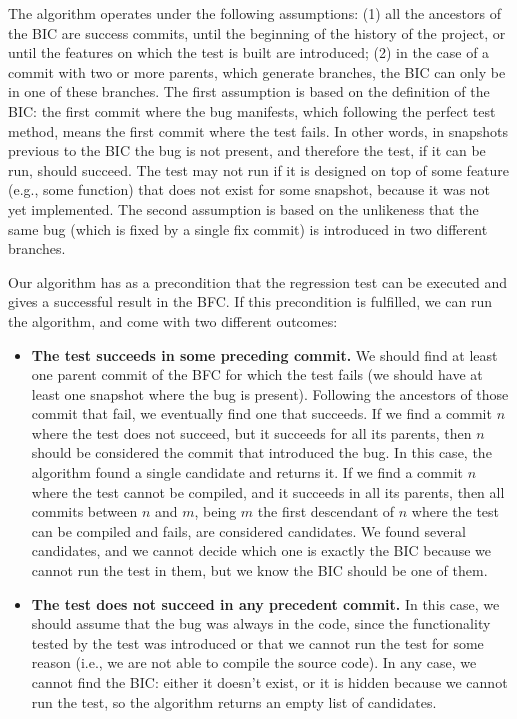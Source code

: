 The algorithm operates under the following assumptions: (1) all the ancestors of the BIC are success commits, until the beginning of the history of the project, or until the features on which the test is built are introduced; (2) in the case of a commit with two or more parents, which generate branches, the BIC can only be in one of these branches.
The first assumption is based on the definition of the BIC: the first commit where the bug manifests, which following the perfect test method, means the first commit where the test fails. In other words, in snapshots previous to the BIC the bug is not present, and therefore the test, if it can be run, should succeed. The test may not run if it is designed on top of some feature (e.g., some function) that does not exist for some snapshot, because it was not yet implemented.
The second assumption is based on the unlikeness that the same bug (which is fixed by a single fix commit) is introduced in two different branches. 

Our algorithm has as a precondition that the regression test can be executed and gives a successful result in the BFC.
If this precondition is fulfilled, we can run the algorithm, and come with two different outcomes:

\begin{itemize}
\item \textbf{The test succeeds in some preceding commit.}
  We should find at least one parent commit of the BFC for which the test fails (we should have at least one snapshot where the bug is present). 
  Following the ancestors of those commit that fail, we eventually find one that succeeds. 
  If we find a commit $n$ where the test does not succeed, but it succeeds for all its parents, then $n$ should be considered the commit that introduced the bug. 
  In this case, the algorithm found a single candidate and returns it. If we find a commit $n$ where the test cannot be compiled, and it succeeds in all its parents, then all commits between $n$ and $m$, being $m$ the first descendant of $n$ where the test can be compiled and fails, are considered candidates. 
  We found several candidates, and we cannot decide which one is exactly the BIC because we cannot run the test in them, but we know the BIC should be one of them.
\item \textbf{The test does not succeed in any precedent commit.}
  In this case, we should assume that the bug was always in the code, since the functionality tested by the test was introduced or that we cannot run the test for some reason (i.e., we are not able to compile the source code). In any case, we cannot find the BIC: either it doesn't exist, or it is hidden because we cannot run the test, so the algorithm returns an empty list of candidates.
\end{itemize}

